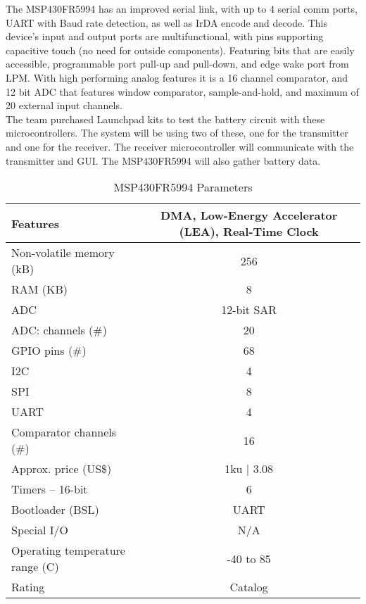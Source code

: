 \documentclass[12pt]{article}
\begin{document}
\indent
The MSP430FR5994 has an improved serial link, with up to 4 serial comm ports, UART with Baud rate detection, as well as IrDA encode and decode. This device’s input and output ports are multifunctional, with pins supporting capacitive touch (no need for outside components). Featuring bits that are easily accessible, programmable port pull-up and pull-down, and edge wake port from LPM. With high performing analog features it is a 16 channel comparator, and 12 bit ADC that features window comparator, sample-and-hold, and maximum of 20 external input channels. \cite{MSP430FR599x} \\

\indent
The team purchased Launchpad kits to test the battery circuit with these microcontrollers. The system will be using two of these, one for the transmitter and one for the receiver. The receiver microcontroller will communicate with the transmitter and GUI. The MSP430FR5994 will also gather battery data. \\
\hfill
\begin{table}[h!]
\centering
\caption{MSP430FR5994 Parameters \cite{MSP430FR599x}}
\begin{tabular}{| l | c |}
\hline
Features & \parbox{0.3\linewidth}{ 
DMA, Low-Energy Accelerator (LEA), Real-Time Clock
} \\
\hline
Non-volatile memory (kB) & 256\\
\hline
RAM (KB) & 8\\
\hline
ADC & 12-bit SAR\\
\hline
ADC: channels (\#) & 20\\
\hline
GPIO pins (\#) & 68\\
\hline
I2C & 4\\
\hline
SPI & 8\\
\hline
UART & 4\\
\hline
Comparator channels (\#) & 16\\
\hline
Approx. price (US\$) & 1ku $|$ 3.08\\
\hline
Timers – 16-bit & 6\\
\hline
Bootloader (BSL) & UART\\
\hline
Special I/O & N/A\\
\hline
Operating temperature range (C) & -40 to 85\\
\hline
Rating & Catalog\\
\hline
\end{tabular}
\end{table}
\hfill \\
\pagebreak
\hfill \\
\end{document}
